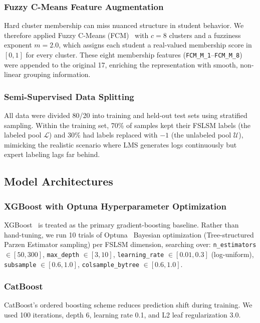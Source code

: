 \documentclass[journal, onecolumn]{IEEEtran}
\begin{document}
\subsubsection{Fuzzy C-Means Feature Augmentation}
Hard cluster membership can miss nuanced structure in student behavior. We therefore applied Fuzzy C-Means (FCM)~\cite{bezdek1981pattern} with $c = 8$ clusters and a fuzziness exponent $m = 2.0$, which assigns each student a real-valued membership score in $[0,1]$ for every cluster. These eight membership features (\texttt{FCM\_M\_1}--\texttt{FCM\_M\_8}) were appended to the original 17, enriching the representation with smooth, non-linear grouping information.

\subsubsection{Semi-Supervised Data Splitting}
All data were divided 80/20 into training and held-out test sets using stratified sampling. Within the training set, 70\% of samples kept their FSLSM labels (the labeled pool $\mathcal{L}$) and 30\% had labels replaced with $-1$ (the unlabeled pool $\mathcal{U}$), mimicking the realistic scenario where LMS generates logs continuously but expert labeling lags far behind.

\subsection{Model Architectures}

\subsubsection{XGBoost with Optuna Hyperparameter Optimization}
XGBoost~\cite{chen2016xgboost} is treated as the primary gradient-boosting baseline. Rather than hand-tuning, we run 10 trials of Optuna~\cite{akiba2019optuna} Bayesian optimization (Tree-structured Parzen Estimator sampling) per FSLSM dimension, searching over: \texttt{n\_estimators} $\in [50, 300]$, \texttt{max\_depth} $\in [3, 10]$, \texttt{learning\_rate} $\in [0.01, 0.3]$ (log-uniform), \texttt{subsample} $\in [0.6, 1.0]$, \texttt{colsample\_bytree} $\in [0.6, 1.0]$.

\subsubsection{CatBoost}
CatBoost's ordered boosting scheme reduces prediction shift during training. We used 100 iterations, depth 6, learning rate 0.1, and L2 leaf regularization 3.0.
\end{document}
